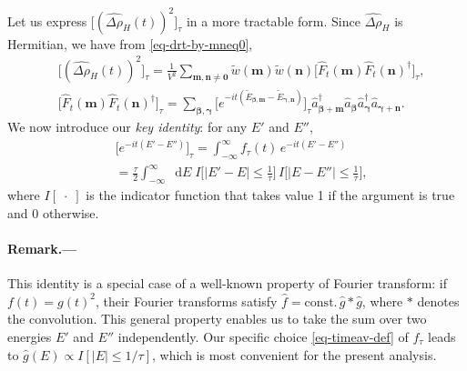 \documentclass[aps,prl,superscriptaddress,reprint]{revtex4-2}
\newcommand{\se}[1]{\paragraph{#1.---}}
\newcommand*{\dd}{\mathop{}\!\mathrm{d}}
\theoremstyle{definition}
\newcommand{\nabs}[1]{{| #1 |}}
\newcommand{\bigbrak}[1]{\bigl[{#1}\bigr]}
\newcommand{\ti}{\tilde}
\newcommand{\ha}{\hat}
\newcommand{\wh}{\widehat}
\newcommand{\da}[1]{#1^\dag}
\newcommand{\ta}{\tau}
\renewcommand{\b}{\beta}
\renewcommand{\c}{\gamma}
\newcommand{\De}{\varDelta}
\renewcommand{\r}{\rho}
\newcommand{\f}{\frac}
\newcommand{\ve}[1]{\boldsymbol{#1}}
\renewcommand{\le}{\leqslant}
\newcommand{\tx}{\text}
\newcommand{\intinf}{\int_{-\infty}^\infty}
\newcommand{\bb}{{\ve \b}}
\newcommand{\cc}{{\ve \c}}
\newcommand{\mm}{{\ve m}}
\newcommand{\zz}{{\ve 0}}
\begin{document}
Let us express  $\bigbrak{ (\wh{\De\r}_H(t))^2 }_\ta$ in a more tractable
form.
Since $\wh{\De\r}_H$ is Hermitian,
we have from \eqref{eq-drt-by-mneq0},
\begin{align}
  	&{\bigbrak{ (\wh{\De\r}_H(t))^2 }_\ta}
  	=
    \frac{1}{V^2}
    \sum_{\mm,\ve n\ne\zz} \ti w(\mm)\ti w(\ve n)
    \bigbrak{ \ha F_t(\mm)\ha F_t(\ve n)^\dagger }_\ta,
    \label{eq-to-FF}
  	\\
  	&\bigbrak{ \ha F_t(\mm)\ha F_t(\ve n)^\dagger }_\ta
  	=
  	\sum_{\bb,\cc}
  	\bigbrak{
  	e^{-it(\ti E_{\bb,\mm}-\ti E_{\cc,\ve n})}
  	}_\ta
    \da {\ha a}_{\bb+\mm} {\ha a}_{\bb} \da {\ha a}_{\cc} {\ha a}_{\cc+\ve n}.
    \label{eq-FFexp.2}
\end{align}
We now introduce our \emph{key identity}: for any $E'$ and $E''$,
\begin{align}
	&
	\bigbrak{
  	e^{-it( E' - E'')}
  	}_\ta
  	= \int_{-\infty}^{\infty} f_\tau(t) \,
	e^{-it( E' - E'')}
	\nonumber \\
	&
	=
	\f\ta2
    \intinf \dd E\;
    I\bigbrak{\nabs{E'-E }\le\f1\ta}\,
    I\bigbrak{\nabs{E-E'' } \le\f1\ta},
    \label{eq-decomp-meas}
\end{align}
where $I[\;\cdot\;]$ is the indicator function that takes value
1 if the argument is true and 0 otherwise.


\se{Remark}
This identity is a special case of a
well-known property of
Fourier transform: if $f(t) = g(t)^2$, their Fourier transforms
satisfy $\widehat{f} = \tx{{const.}} \, \hat{g} *  \hat{g}$, where $*$
denotes the convolution.
This general property enables us to
take the sum over two energies $E'$ and $E''$ independently.
Our specific choice \eqref{eq-timeav-def} of $f_\tau$ leads to
$\hat{g}(E) \propto  I[ |E| \le 1/\tau]$,
which is most convenient for the present analysis.
\end{document}
